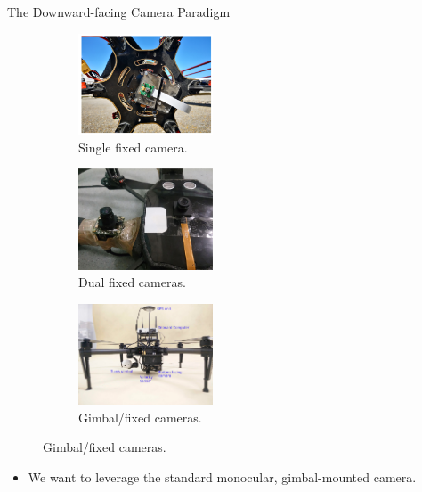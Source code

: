 \documentclass[aspectratio=169]{beamer}
\begin{document}
\begin{frame}{The Downward-facing Camera Paradigm}
	\vspace*{\fill}
	\begin{figure}[]
	    \centering
	    \begin{subfigure}[b]{0.3\linewidth}
		\includegraphics[height=3cm]{./images/wubben_drone}
		    \caption{Single fixed camera.~\cite{accurate_landing_UAV_ground_pattern}}
	    \end{subfigure}
		\hspace{0.01\linewidth}
	    \begin{subfigure}[b]{0.3\linewidth}
		\includegraphics[height=3cm]{./images/araar_drone}
		    \caption{Dual fixed cameras.~\cite{fiducial_landing_many_markers_voting_fixed_camera}}
	    \end{subfigure}
		\hspace{0.01\linewidth}
	    \begin{subfigure}[b]{0.3\linewidth}
		\includegraphics[height=3cm]{./images/borowczyk_drone}
		    \caption{Gimbal/fixed cameras.~\cite{high_velocity_landing}}
	    \end{subfigure}
	\end{figure}
	\vspace{0.5cm}
	\begin{itemize}
		\item We want to leverage the standard monocular, gimbal-mounted camera.
	\end{itemize}
	\vspace*{\fill}
\end{frame}
\end{document}
